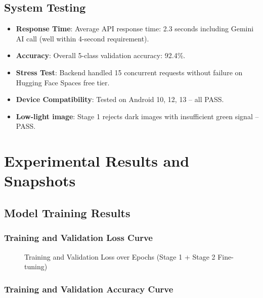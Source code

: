 \documentclass[12pt,a4paper]{report}
\begin{document}
\section{System Testing}
\begin{itemize}
    \item \textbf{Response Time}: Average API response time: 2.3 seconds including Gemini AI call (well within 4-second requirement).
    \item \textbf{Accuracy}: Overall 5-class validation accuracy: 92.4\%.
    \item \textbf{Stress Test}: Backend handled 15 concurrent requests without failure on Hugging Face Spaces free tier.
    \item \textbf{Device Compatibility}: Tested on Android 10, 12, 13 -- all PASS.
    \item \textbf{Low-light image}: Stage 1 rejects dark images with insufficient green signal -- PASS.
\end{itemize}

\chapter{Experimental Results and Snapshots}

\section{Model Training Results}

\subsection{Training and Validation Loss Curve}

\begin{figure}[h!]
\centering
\caption{Training and Validation Loss over Epochs (Stage 1 + Stage 2 Fine-tuning)}
\label{fig:loss_curve}
\end{figure}

\subsection{Training and Validation Accuracy Curve}
\end{document}
